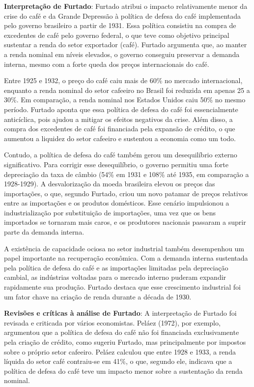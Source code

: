 \documentclass[a4paper,12pt]{article}[abntex2]
\begin{document}
\textbf{Interpretação de Furtado}: Furtado atribui o impacto relativamente menor da crise do café e da Grande Depressão à política de defesa do café implementada pelo governo brasileiro a partir de 1931. Essa política consistiu na compra de excedentes de café pelo governo federal, o que teve como objetivo principal sustentar a renda do setor exportador (café). Furtado argumenta que, ao manter a renda nominal em níveis elevados, o governo conseguiu preservar a demanda interna, mesmo com a forte queda dos preços internacionais do café. 

Entre 1925 e 1932, o preço do café caiu mais de 60\% no mercado internacional, enquanto a renda nominal do setor cafeeiro no Brasil foi reduzida em apenas 25 a 30\%. Em comparação, a renda nominal nos Estados Unidos caiu 50\% no mesmo período. Furtado aponta que essa política de defesa do café foi essencialmente anticíclica, pois ajudou a mitigar os efeitos negativos da crise. Além disso, a compra dos excedentes de café foi financiada pela expansão de crédito, o que aumentou a liquidez do setor cafeeiro e sustentou a economia como um todo.

Contudo, a política de defesa do café também gerou um desequilíbrio externo significativo. Para corrigir esse desequilíbrio, o governo permitiu uma forte depreciação da taxa de câmbio (54\% em 1931 e 108\% até 1935, em comparação a 1928-1929). A desvalorização da moeda brasileira elevou os preços das importações, o que, segundo Furtado, criou um novo patamar de preços relativos entre as importações e os produtos domésticos. Esse cenário impulsionou a industrialização por substituição de importações, uma vez que os bens importados se tornaram mais caros, e os produtores nacionais passaram a suprir parte da demanda interna.

A existência de capacidade ociosa no setor industrial também desempenhou um papel importante na recuperação econômica. Com a demanda interna sustentada pela política de defesa do café e as importações limitadas pela depreciação cambial, as indústrias voltadas para o mercado interno puderam expandir rapidamente sua produção. Furtado destaca que esse crescimento industrial foi um fator chave na criação de renda durante a década de 1930.

\textbf{Revisões e críticas à análise de Furtado}: A interpretação de Furtado foi revisada e criticada por vários economistas. Peláez (1972), por exemplo, argumentou que a política de defesa do café não foi financiada exclusivamente pela criação de crédito, como sugeriu Furtado, mas principalmente por impostos sobre o próprio setor cafeeiro. Peláez calculou que entre 1928 e 1933, a renda líquida do setor café contraiu-se em 41\%, o que, segundo ele, indicava que a política de defesa do café teve um impacto menor sobre a sustentação da renda nominal.
\end{document}
